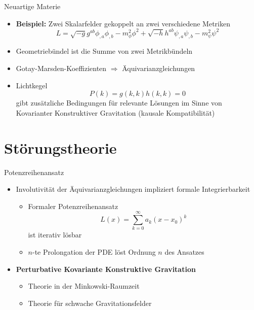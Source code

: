 \documentclass{beamer}
\begin{document}
    \begin{frame}{Neuartige Materie}
        \begin{itemize}
            \item \textbf{Beispiel:} Zwei Skalarfelder gekoppelt an zwei verschiedene Metriken
            \[ L = \sqrt{-g} g^{ab} \phi_{,a}\phi_{,b} - m_\phi^2 \phi^2 + \sqrt{-h} h^{ab} \psi_{,a}\psi_{,b} - m_\psi^2 \psi^2 \] \pause
            \item Geometriebündel ist die Summe von zwei Metrikbündeln \pause
            \item Gotay-Marsden-Koeffizienten $\Rightarrow$ Äquivarianzgleichungen \pause
            \item Lichtkegel
            \[ P(k) = g(k,k) h(k,k) = 0 \]
            gibt zusätzliche Bedingungen für relevante Lösungen im Sinne von Kovarianter
            Konstruktiver Gravitation (kausale Kompatibilität)
        \end{itemize}
    \end{frame}


    \section{Störungstheorie}\label{sec:stoerungstheorie}

    \begin{frame}{Potenzreihenansatz}
        \begin{itemize}
            \item Involutivität der Äquivarianzgleichungen impliziert formale Integrierbarkeit
            \begin{itemize}
                \item Formaler Potenzreihenansatz \[ L(x) = \sum_{k=0}^\infty a_k (x-x_0)^k \] ist iterativ lösbar
                \item $n$-te Prolongation der PDE löst Ordnung $n$ des Ansatzes
            \end{itemize}
            \item \textbf{Perturbative Kovariante Konstruktive Gravitation}
            \begin{itemize}
                \item {} Theorie in der \alert{Minkowski}-Raumzeit
                \item {} Theorie für schwache Gravitationsfelder
            \end{itemize}
        \end{itemize}
    \end{frame}
\end{document}

